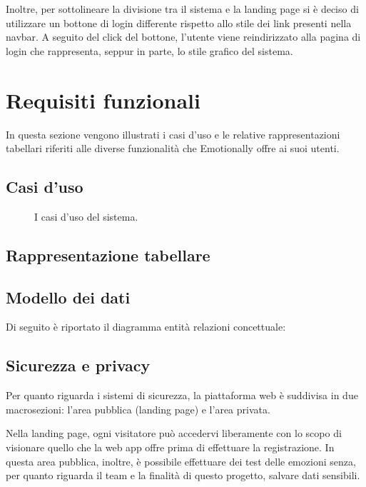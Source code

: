 Inoltre, per sottolineare la divisione tra il sistema e la landing page si è 
deciso di utilizzare un bottone di login differente rispetto allo stile dei 
link presenti nella navbar. A seguito del click del bottone, l'utente viene 
reindirizzato alla pagina di login che rappresenta, seppur in parte, lo stile 
grafico del sistema.

\section{Requisiti funzionali}\label{sec:requisiti-funzionali}

In questa sezione vengono illustrati i casi d'uso e le relative 
rappresentazioni tabellari riferiti alle diverse funzionalità che Emotionally 
offre ai suoi utenti. 

\subsection{Casi d'uso}

\begin{figure}[H]
	\centering
    \caption{I casi d'uso del sistema.}
    \label{fig:casi-duso}
    \resizebox{\textwidth}{!}{%
        
    }
\end{figure}

\subsection{Rappresentazione tabellare}


\subsection{Modello dei dati}
Di seguito è riportato il diagramma entità relazioni concettuale:


\subsection{Sicurezza e privacy}
Per quanto riguarda i sistemi di sicurezza, la piattaforma web è suddivisa in 
due macrosezioni: l'area pubblica (landing page) e l'area privata.

Nella landing page, ogni visitatore può accedervi liberamente con lo scopo di 
visionare quello che la web app offre prima di effettuare la registrazione. In 
questa area pubblica, inoltre, è possibile effettuare dei test delle emozioni 
senza, per quanto riguarda il team e la finalità di questo progetto, salvare 
dati sensibili.

